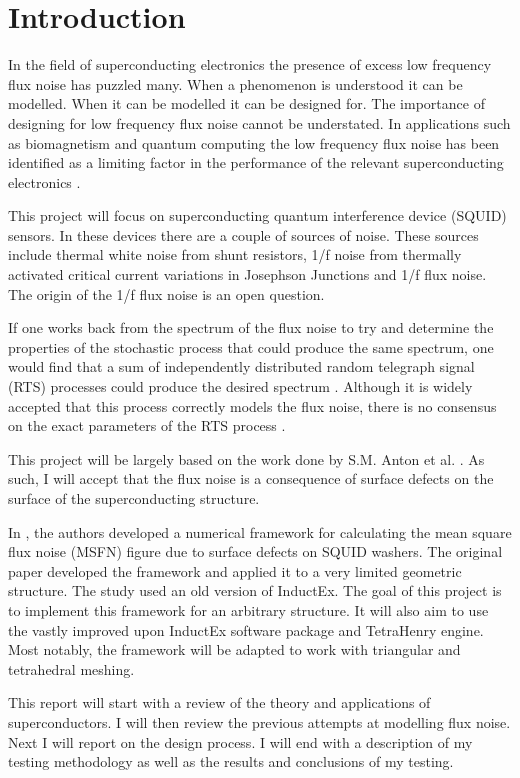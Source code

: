 \graphicspath{{introduction/fig/}}

\chapter{Introduction}
\label{chap:introduction}

In the field of superconducting electronics the presence of excess low frequency flux noise has puzzled many. When a phenomenon is understood it can be modelled. When it can be modelled it can be designed for. The importance of designing for low frequency flux noise cannot be understated. In applications such as biomagnetism and quantum computing the low frequency flux noise has been identified as a limiting factor in the performance of the relevant superconducting electronics \cite{KochModel}. \par
This project will focus on superconducting quantum interference device (SQUID) sensors. In these devices there are a couple of sources of noise. These sources include thermal white noise from shunt resistors, 1/f noise from thermally activated critical current variations in Josephson Junctions and 1/f flux noise. The origin of the 1/f flux noise is an open question. \par
If one works back from the spectrum of the flux noise to try and determine the properties of the stochastic process that could produce the same spectrum, one would find that a sum of independently distributed random telegraph signal (RTS) processes could produce the desired spectrum \cite{fluxNoiseSquidsStevenAnton}. Although it is widely accepted that this process correctly models the flux noise, there is no consensus on the exact parameters of the RTS process \cite{fluxNoiseSquidsStevenAnton}. \par
This project will be largely based on the work done by S.M. Anton et al. \cite{fluxNoiseSquidsStevenAnton}. As such, I will accept that the flux noise is a consequence of surface defects on the surface of the superconducting structure. \par
In \cite{fluxNoiseSquidsStevenAnton}, the authors developed a numerical framework for calculating the mean square flux noise (MSFN) figure due to surface defects on SQUID washers. The original paper developed the framework and applied it to a very limited geometric structure. The study used an old version of InductEx. The goal of this project is to implement this framework for an arbitrary structure. It will also aim to use the vastly improved upon InductEx software package and TetraHenry engine. Most notably, the framework will be adapted to work with triangular and tetrahedral meshing. \par
This report will start with a review of the theory and applications of superconductors. I will then review the previous attempts at modelling flux noise. Next I will report on the design process. I will end with a description of my testing methodology as well as the results and conclusions of my testing. 
